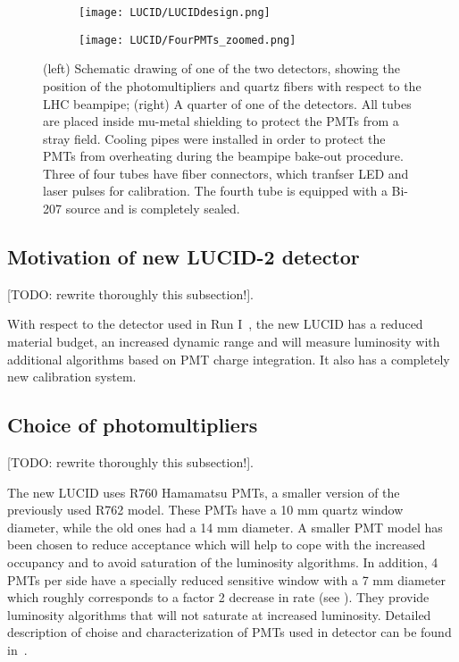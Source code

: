 \begin{figure}
\centering
\begin{subfigure}{.5\textwidth}
  \centering
  \texttt{[image: LUCID/LUCIDdesign.png]}
\end{subfigure}%
\begin{subfigure}{.5\textwidth}
  \centering
  \texttt{[image: LUCID/FourPMTs\_zoomed.png]}
\end{subfigure}
\caption{(left) Schematic drawing of one of the two detectors, showing the position of the photomultipliers 
and quartz fibers with respect to the LHC beampipe; (right) A quarter of one of the detectors. All tubes are 
placed inside mu-metal shielding to protect the PMTs from a stray field. Cooling pipes were installed in order 
to protect the PMTs from overheating during the beampipe bake-out procedure. Three of four tubes have fiber connectors, which
tranfser LED and laser pulses for calibration. The fourth tube is equipped with a Bi-207 source and is completely 
sealed.}
\label{fig:LucidDrawing}
\end{figure}


\subsection{Motivation of new LUCID-2 detector}
\label{subsec:motivationNewLucid}

[TODO: rewrite thoroughly this subsection!].

With respect to the detector used in Run I~\cite{Aad:2013ucp}, the new LUCID has a reduced material budget, 
an increased dynamic 
range and will measure luminosity with additional algorithms based on PMT charge integration. It also has a 
completely new calibration system.

\subsection{Choice of photomultipliers}
\label{subsec:PMTChoice}

[TODO: rewrite thoroughly this subsection!].

The new LUCID uses R760 Hamamatsu PMTs, a smaller version of the previously used R762 model. These PMTs have a 
10 mm quartz window diameter, while the old ones had a 14 mm diameter. A smaller PMT model has been chosen to reduce acceptance 
which will help to cope with the increased occupancy and to avoid saturation of the luminosity algorithms.
In addition, 4 PMTs per side have a specially reduced sensitive window with a 7 mm diameter which roughly 
corresponds to a factor 2 decrease in rate (see ). They provide luminosity algorithms that will not saturate at 
increased luminosity. Detailed description of choise and characterization of PMTs used in detector can be found in~\cite{Alberghi:2016tad}.

